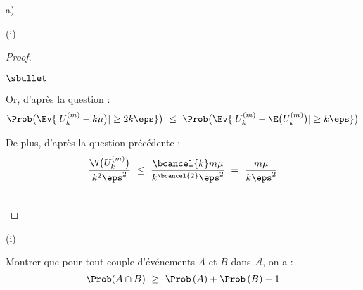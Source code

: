 \documentclass[11pt]{article}%
\begin{document}
\begin{liste}{a)}
\begin{nonoliste}{(i)}
\begin{proof}
\begin{noliste}{$\sbullet$}
      \item Or, d'après la question  :
        \[
        \Prob\big( \Ev{|U_k^{(m)} - k \mu \big)| \geq 2 k \eps} \big) \
        \leq \ \Prob\big( \Ev{|U_k^{(m)} - \E\big( U_k^{(m)} \big)|
          \geq k \eps} \big)
        \]

      \item De plus, d'après la question précédente :
        \[
        \dfrac{\V\big(U_k^{(m)} \big)}{k^2 \eps^2} \ \leq \
        \dfrac{\bcancel{k} m \mu}{k^{\bcancel{2}} \eps^2} \ = \
        \dfrac{m \mu}{k \eps^2}
        \]
      \end{noliste}
      ~\\[-1.2cm]
    \end{proof}
  \end{nonoliste}

\item
  \begin{nonoliste}{(i)}
  \item Montrer que pour tout couple d'événements $A$ et $B$ dans
    $\mathcal{A}$, on a :
    \[
    \Prob(A \cap B) \ \geq \  \Prob\left(A\right) + \Prob\left(B \right)-1
    \]


\end{nonoliste}
\end{liste}
\end{document}
